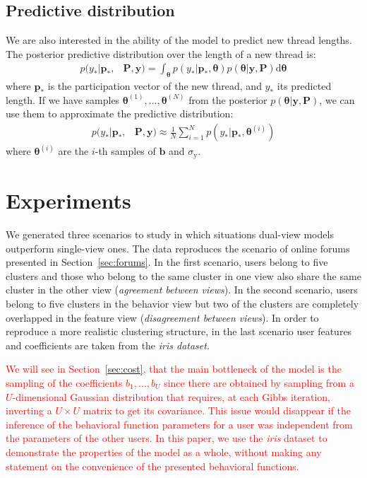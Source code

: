 \documentclass[smallextended]{svjour3}          %
\newcommand\alberto[1]{\textcolor{red}{#1}}
\begin{document}
\subsection{Predictive distribution}
We are also interested in the ability of the model to predict new thread lengths. The posterior predictive distribution over the length of a new thread is:
\begin{align}
p(y_* | \mathbf{p_*}, & \mathbf{P}, \mathbf{y}) =
\int_{\boldsymbol{\theta}} 
p(y_* | \mathbf{p_*}, \boldsymbol{\theta})
p(\boldsymbol{\theta} | \mathbf{y}, \mathbf{P}) \text{d}\boldsymbol{\theta}
\end{align}
where $\mathbf{p_*}$ is the participation vector of the new thread, and $y_*$ its predicted length.
If we have samples $\boldsymbol{\theta}^{(1)},...,\boldsymbol{\theta}^{(N)}$ from the posterior $p(\boldsymbol{\theta}| \mathbf{y}, \mathbf{P})$, we can use them to approximate the predictive distribution:
\begin{align}
p(y_* | \mathbf{p_*}, & \mathbf{P}, \mathbf{y}) 
\approx
\frac{1}{N}
\sum_{i=1}^N
p(y_* | \mathbf{p_*}, \boldsymbol{\theta}^{(i)})
\label{eq:predictive_posterior_approx}
\end{align}
where $\boldsymbol{\theta}^{(i)}$ are the $i$-th samples of $\mathbf{b}$ and $\sigma_\text{y}$.


\section{Experiments}\label{sec:experiments}
We generated three scenarios to study in which situations dual-view models outperform single-view ones. The data reproduces the scenario of online forums presented in Section~\ref{sec:forums}. In the first scenario, users belong to five clusters and those who belong to the same cluster in one view also share the same cluster in the other view (\textit{agreement between views}). In the second scenario, users belong to five clusters in the behavior view but two of the clusters are completely overlapped in the feature view (\textit{disagreement between views}). In order to reproduce a more realistic clustering structure, in the last scenario user features and coefficients are taken from the \textit{iris dataset}. 

\alberto{We will see in Section~\ref{sec:cost}, that the main bottleneck of the model is the sampling of the coefficients $b_1,...,b_U$ since there are obtained by sampling from a $U$-dimensional Gaussian distribution that requires, at each Gibbs iteration, inverting a $U\times U$ matrix to get its covariance. This issue would disappear if the inference of the behavioral function parameters for a user was independent from the parameters of the other users. In this paper, we use the \textit{iris} dataset to demonstrate the properties of the model as a whole, without making any statement on the convenience of the presented behavioral functions.} 
\end{document}
